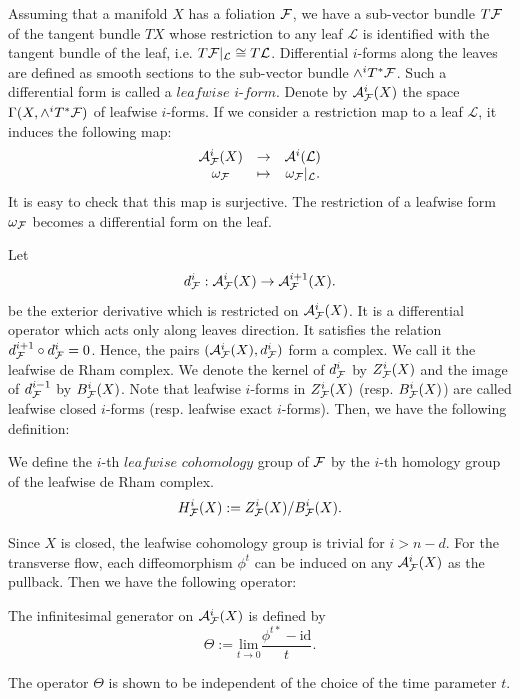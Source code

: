 Assuming that a manifold $X$ has a foliation ${\mathcal{F}}$, we have a sub-vector bundle $T{\mathcal{F}}$ of the tangent bundle $TX$ whose restriction to any leaf $\mathcal{L}$ is identified with the tangent bundle of the leaf, i.e. $T{\mathcal{F}}|_{\mathcal{L}}\cong T\mathcal{L}$. 
Differential $i$-forms along the leaves are defined as smooth sections to the sub-vector bundle $\wedge^{i} T^{*}{\mathcal{F}}$. 
Such a differential form is called a $\mathit{leafwise}$ $i$-$\mathit{form}$. 
Denote by $\mathcal{A}^{i}_{{\mathcal{F}}}(X)$ the space $\Gamma(X,\wedge^{i} T^{*}{\mathcal{F}})$ of leafwise $i$-forms. 
If we consider a restriction map to a leaf $\mathcal{L}$, it induces the following map:
\begin{equation}
\label{eq:1.1}
\begin{matrix}
    \mathcal{A}^{i}_{{\mathcal{F}}}(X) & \rightarrow & \mathcal{A}^{i}(\mathcal{L}) \\
    \omega_{{\mathcal{F}}} &\mapsto &\omega_{{\mathcal{F}}}|_{\mathcal{L}}.
\end{matrix}
\end{equation}
It is easy to check that this map is surjective. 
The restriction of a leafwise form $\omega_{{\mathcal{F}}}$ becomes a differential form on the leaf. 

Let 
\begin{equation*}
d^{i}_{{\mathcal{F}}} : \mathcal{A}^{i}_{{\mathcal{F}}}(X) \rightarrow \mathcal{A}^{i+1}_{{\mathcal{F}}}(X).
\end{equation*}
be the exterior derivative which is restricted on $\mathcal{A}^{i}_{{\mathcal{F}}}(X)$. 
It is a differential operator which acts only along leaves direction. 
It satisfies the relation $d^{i+1}_{{\mathcal{F}}} \circ d^{i}_{{\mathcal{F}}} = 0$. 
Hence, the pairs $(\mathcal{A}^{i}_{{\mathcal{F}}}(X),d^{i}_{{\mathcal{F}}})$ form a complex. 
We call it the leafwise de Rham complex. We denote the kernel of $d_{{\mathcal{F}}}^{i}$ by $Z^{i}_{{\mathcal{F}}}(X)$ and the image of $d_{{\mathcal{F}}}^{i-1}$ by $B^{i}_{{\mathcal{F}}}(X)$. 
Note that leafwise $i$-forms in $Z^{i}_{{\mathcal{F}}}(X)$ (resp. $B^{i}_{{\mathcal{F}}}(X)$) are called leafwise closed $i$-forms (resp. leafwise exact $i$-forms).
Then, we have the following definition:
\begin{definition}
We define the $i$-th $\mathit{leafwise}$ $\mathit{cohomology}$ group of ${\mathcal{F}}$ by the $i$-th homology group of the leafwise de Rham complex.
\begin{equation*}
    H^{i}_{{\mathcal{F}}}(X) := Z^{i}_{{\mathcal{F}}}(X) / B^{i}_{{\mathcal{F}}}(X).
\end{equation*}
\end{definition}
Since $X$ is closed, the leafwise cohomology group is trivial for $i>n-d$.
For the transverse flow, each diffeomorphism $\phi^{t}$ can be induced on any $\mathcal{A}^{i}_{{\mathcal{F}}}(X)$ as the pullback. 
Then we have the following operator:
\begin{definition}
The infinitesimal generator on  $\mathcal{A}^{i}_{{\mathcal{F}}}(X)$ is defined by
\begin{equation*}
    \Theta := \underset{t\rightarrow0}{\mathrm{lim}} \frac{\phi^{t*}- \mathrm{id}}{t}.
\end{equation*}
\end{definition}
The operator $\Theta$ is shown to be independent of the choice of the time parameter $t$. 
